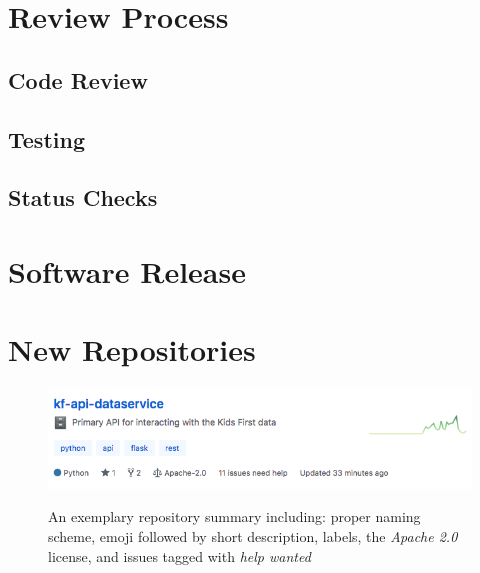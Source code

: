 \documentclass[a4paper,12pt,titlepage]{scrartcl}
\begin{document}
	\section{Review Process}
	
	\subsection{Code Review}
	
	\subsection{Testing}
	
	\subsection{Status Checks}
   
	\section{Software Release}
	
	\section{New Repositories}
	
	\begin{figure}
    		\centering
    		\includegraphics[width=0.6\linewidth]{images/reposummary.png}
    		\label{fig:reposummary}
    		\caption{An exemplary repository summary including: proper naming scheme, emoji followed by short description, labels, the {\em Apache 2.0} license, and issues tagged with {\em help wanted}}
    \end{figure}
   
\end{document}
